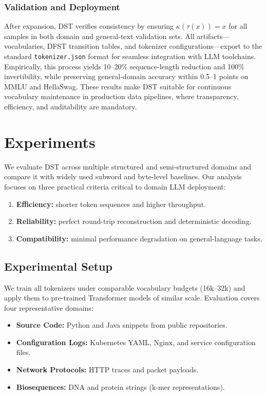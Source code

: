 \subsubsection{Validation and Deployment}

After expansion, DST verifies consistency by ensuring $\kappa(\tau(x))=x$ for all samples in both domain and general-text validation sets.
All artifacts—vocabularies, DFST transition tables, and tokenizer configurations—export to the standard \texttt{tokenizer.json} format for seamless integration with LLM toolchains.
Empirically, this process yields 10–20\% sequence-length reduction and 100\% invertibility, while preserving general-domain accuracy within 0.5–1 points on MMLU and HellaSwag.
These results make DST suitable for continuous vocabulary maintenance in production data pipelines, where transparency, efficiency, and auditability are mandatory.

\section{Experiments}
\label{sec:experiments}

We evaluate DST across multiple structured and semi-structured domains and compare it with widely used subword and byte-level baselines.
Our analysis focuses on three practical criteria critical to domain LLM deployment:

\begin{enumerate}
    \item \textbf{Efficiency:} shorter token sequences and higher throughput.
    \item \textbf{Reliability:} perfect round-trip reconstruction and deterministic decoding.
    \item \textbf{Compatibility:} minimal performance degradation on general-language tasks.
\end{enumerate}

\subsection{Experimental Setup}

We train all tokenizers under comparable vocabulary budgets (16k–32k) and apply them to pre-trained Transformer models of similar scale.
Evaluation covers four representative domains:

\begin{itemize}
    \item \textbf{Source Code:} Python and Java snippets from public repositories.
    \item \textbf{Configuration Logs:} Kubernetes YAML, Nginx, and service configuration files.
    \item \textbf{Network Protocols:} HTTP traces and packet payloads.
    \item \textbf{Biosequences:} DNA and protein strings (k-mer representations).
\end{itemize}

